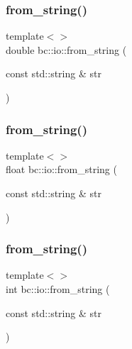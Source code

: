 \subsubsection{\texorpdfstring{from\+\_\+string()}{from\_string()}\hspace{0.1cm}{\footnotesize\ttfamily [1/4]}}
{\footnotesize\ttfamily template$<$$>$ \\
double bc\+::io\+::from\+\_\+string (\begin{DoxyParamCaption}\item[{const std\+::string \&}]{str }\end{DoxyParamCaption})\hspace{0.3cm}{\ttfamily [inline]}}

\mbox{\label{namespacebc_1_1io_a274a01eef477a0e229ff1f66e44641cd}} 
\subsubsection{\texorpdfstring{from\+\_\+string()}{from\_string()}\hspace{0.1cm}{\footnotesize\ttfamily [2/4]}}
{\footnotesize\ttfamily template$<$$>$ \\
float bc\+::io\+::from\+\_\+string (\begin{DoxyParamCaption}\item[{const std\+::string \&}]{str }\end{DoxyParamCaption})\hspace{0.3cm}{\ttfamily [inline]}}

\mbox{\label{namespacebc_1_1io_a3debf1fdb9e25a53feffe53a9d7059ec}} 
\subsubsection{\texorpdfstring{from\+\_\+string()}{from\_string()}\hspace{0.1cm}{\footnotesize\ttfamily [3/4]}}
{\footnotesize\ttfamily template$<$$>$ \\
int bc\+::io\+::from\+\_\+string (\begin{DoxyParamCaption}\item[{const std\+::string \&}]{str }\end{DoxyParamCaption})\hspace{0.3cm}{\ttfamily [inline]}}

